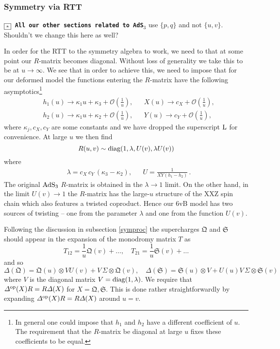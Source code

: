 \documentclass[12pt,a4paper]{article}
\numberwithin{equation}{section}
\newcommand{\kQ}{\mathfrak{Q}}
\newcommand{\kS}{\mathfrak{S}}
\newcommand{\lO}{\mathcal{O}}
\newcommand{\ana}[1]{$\framebox{\tiny a}$\ \textbf{\texttt{{\color{red}\footnotesize#1}}}}
\begin{document}
\medskip

\fi

\subsubsection*{Symmetry via RTT}

\ana{All our other sections related to AdS$ _3 $} use $ \{p,q\}$ and not $ \{u,v\} $. Shouldn't we change this here as well?

In order for the RTT to the symmetry algebra to work, we need to that at some point our $R$-matrix becomes diagonal. Without loss of generality we take this to be at $u\rightarrow\infty$. We see that in order to achieve this, we need to impose that for our deformed model the functions entering the $R$-matrix have the following asymptotics\footnote{In general one could impose that $h_1$ and $h_2$ have a different coefficient of $u$. The requirement that the $R$-matrix be diagonal at large $u$ fixes these coefficients to be equal.}
%
\begin{align}
&h_1(u) \rightarrow \kappa_1 u+\kappa_3+\lO\left(\frac{1}{u}\right)  , &&X(u)\rightarrow c_X + \lO\left(\frac{1}{u}\right),\\
&h_2(u) \rightarrow \kappa_1 u+\kappa_2+\lO\left(\frac{1}{u}\right),&& Y(u)\rightarrow c_Y + \lO\left(\frac{1}{u}\right),
\end{align}
%
where $\kappa_j, c_X,c_Y$ are some constants and we have dropped the superscript ${\rm L}$ for convenience. At large $u$ we then find 
%
\begin{equation}
R(u,v) \sim {\rm diag}(1,\lambda, U(v),\lambda U(v))
\end{equation}
%
where 
%
\begin{align}
&\lambda=c_X\, c_Y\,(\kappa_3-\kappa_2),&& U = \frac{1}{XY(h_1-h_2 )}\,.
\end{align}
%
The original ${\rm AdS}_3$ $R$-matrix is obtained in the $\lambda\rightarrow 1$ limit. On the other hand, in the limit $U(v)\rightarrow 1$ the $R$-matrix has the large-$u$ structure of the XXZ spin chain which also features a twisted coproduct. Hence our 6vB model has two sources of twisting -- one from the parameter $\lambda$ and one from the function $U(v)$. %

\iffalse

Following the discussion in subsection \ref{symproc} the supercharges $\kQ$ and $\kS$ should appear in the expansion of the monodromy matrix $T$ as
\begin{equation}
T_{12} = \frac{1}{u}\kQ(v) + \dots,\quad T_{21} = \frac{1}{u}\kS(v) + \dots
\end{equation}
and so 
\begin{equation}
\Delta(\kQ) = \kQ(u)\otimes VU(v) + V\,\Sigma \otimes \kQ(v),\quad \Delta(\kS) = \kS(u)\otimes V + U(u) V\,\Sigma \otimes \kS(v)
\end{equation}
where $V$ is the diagonal matrix $V={\rm diag}(1,\lambda)$. We require that $\Delta^{\rm op}(X)R = R \Delta(X)$ for $X=\kQ,\kS$. This is done rather straightforwardly by expanding $\Delta^{\rm op}(X)R = R \Delta(X)$ around $u=v$.
\end{document}
